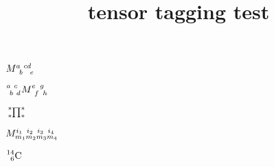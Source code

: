 \documentclass{article}
\title{tensor tagging test}
\begin{document}
$M\indices{^a_b^{cd}_e}$

$\tensor[^a_b^c_d]{M}{^e_f^g_h}$

$\tensor*[^*_*]{\prod\nolimits}{^*_*}$

$\tensor*{M}{*^{i_1}_{m_1}^{i_2}_{m_2}^{i_3}_{m_3}^{i_4}_{m_4}}$


$\nuclide[14][6]{C}$
\end{document}
